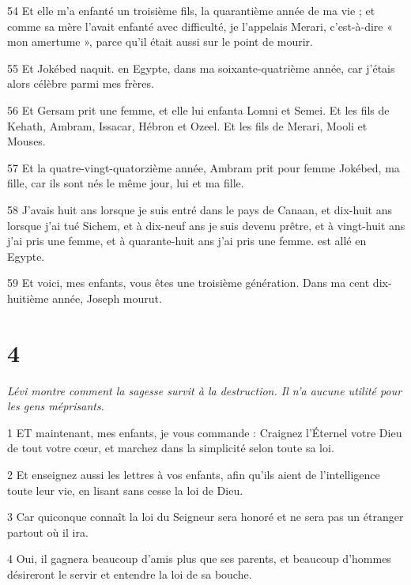 \par 54 Et elle m'a enfanté un troisième fils, la quarantième année de ma vie ; et comme sa mère l'avait enfanté avec difficulté, je l'appelais Merari, c'est-à-dire « mon amertume », parce qu'il était aussi sur le point de mourir.

\par 55 Et Jokébed naquit. en Egypte, dans ma soixante-quatrième année, car j'étais alors célèbre parmi mes frères.

\par 56 Et Gersam prit une femme, et elle lui enfanta Lomni et Semei. Et les fils de Kehath, Ambram, Issacar, Hébron et Ozeel. Et les fils de Merari, Mooli et Mouses.

\par 57 Et la quatre-vingt-quatorzième année, Ambram prit pour femme Jokébed, ma fille, car ils sont nés le même jour, lui et ma fille.

\par 58 J'avais huit ans lorsque je suis entré dans le pays de Canaan, et dix-huit ans lorsque j'ai tué Sichem, et à dix-neuf ans je suis devenu prêtre, et à vingt-huit ans j'ai pris une femme, et à quarante-huit ans j'ai pris une femme. est allé en Egypte.

\par 59 Et voici, mes enfants, vous êtes une troisième génération. Dans ma cent dix-huitième année, Joseph mourut.

\chapter{4}

\par \textit{Lévi montre comment la sagesse survit à la destruction. Il n'a aucune utilité pour les gens méprisants.}

\par 1 ET maintenant, mes enfants, je vous commande : Craignez l'Éternel votre Dieu de tout votre cœur, et marchez dans la simplicité selon toute sa loi.

\par 2 Et enseignez aussi les lettres à vos enfants, afin qu'ils aient de l'intelligence toute leur vie, en lisant sans cesse la loi de Dieu.

\par 3 Car quiconque connaît la loi du Seigneur sera honoré et ne sera pas un étranger partout où il ira.

\par 4 Oui, il gagnera beaucoup d'amis plus que ses parents, et beaucoup d'hommes désireront le servir et entendre la loi de sa bouche.


